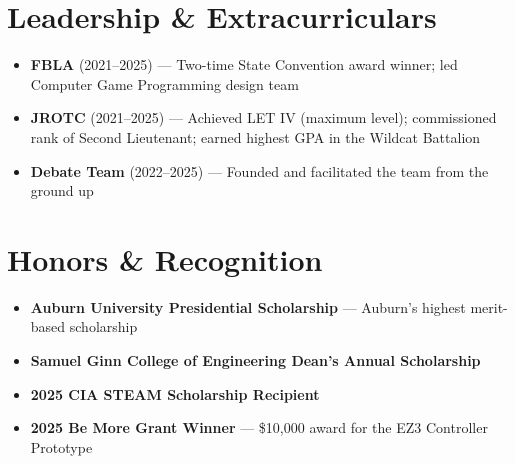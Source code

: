 \documentclass[letterpaper,11pt]{article}
\newcommand{\resumeItem}[1]{
  \item\small{
    {#1 \vspace{-2pt}}
  }
}
\newcommand{\resumeItemListStart}{\begin{itemize}}
\newcommand{\resumeItemListEnd}{\end{itemize}\vspace{-5pt}}
\begin{document}
\section{Leadership \& Extracurriculars}
  \resumeItemListStart
      \resumeItem{\textbf{FBLA} (2021--2025) --- Two-time State Convention award winner; led Computer Game Programming design team}
      \resumeItem{\textbf{JROTC} (2021--2025) --- Achieved LET IV (maximum level); commissioned rank of Second Lieutenant; earned highest GPA in the Wildcat Battalion}
      \resumeItem{\textbf{Debate Team} (2022--2025) --- Founded and facilitated the team from the ground up}
  \resumeItemListEnd


\section{Honors \& Recognition}
  \resumeItemListStart
      \resumeItem{\textbf{Auburn University Presidential Scholarship} --- Auburn's highest merit-based scholarship}
    \resumeItem{\textbf{Samuel Ginn College of Engineering Dean's Annual Scholarship}}
    \resumeItem{\textbf{2025 CIA STEAM Scholarship Recipient}}
      \resumeItem{\textbf{2025 Be More Grant Winner} --- \$10{,}000 award for the EZ3 Controller Prototype}
  \resumeItemListEnd


\end{document}
